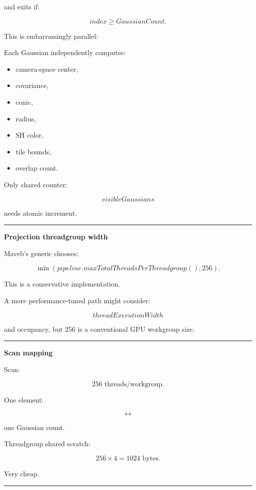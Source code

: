 and exits if:

\[
index\ge GaussianCount.
\]

This is embarrassingly parallel:

Each Gaussian independently computes:

\begin{itemize}
\tightlist
\item
  camera-space center,
\item
  covariance,
\item
  conic,
\item
  radius,
\item
  SH color,
\item
  tile bounds,
\item
  overlap count.
\end{itemize}

Only shared counter:

\[
visibleGaussians
\]

needs atomic increment.

\begin{center}\rule{0.5\linewidth}{0.5pt}\end{center}

\textbf{Projection threadgroup width}

Maveb's generic  chooses:

\[
\min(
pipeline.maxTotalThreadsPerThreadgroup(),
256
).
\]

This is a conservative implementation.

A more performance-tuned path might consider:

\[
threadExecutionWidth
\]

and occupancy, but 256 is a conventional GPU workgroup size.

\begin{center}\rule{0.5\linewidth}{0.5pt}\end{center}

\textbf{Scan mapping}

Scan:

\[
256\text{ threads/workgroup}.
\]

One element:

\[
\leftrightarrow
\]

one Gaussian count.

Threadgroup shared scratch:

\[
256\times4
=
1024\text{ bytes}.
\]

Very cheap.

\begin{center}\rule{0.5\linewidth}{0.5pt}\end{center}

